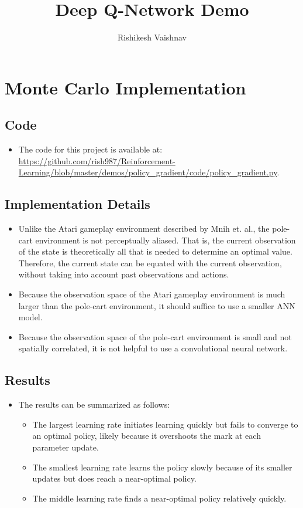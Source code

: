 \documentclass[a4paper]{article}
\title{Deep Q-Network Demo}
\author{Rishikesh Vaishnav}
\begin{document}
\maketitle
\section*{Monte Carlo Implementation}
\subsection*{Code}
\begin{itemize}
    \item The code for this project is available at: 
\url{https://github.com/rish987/Reinforcement-Learning/blob/master/demos/policy_gradient/code/policy_gradient.py}.
\end{itemize}
\subsection*{Implementation Details}
\begin{itemize}
    \item Unlike the Atari gameplay environment described by Mnih et. al., the
        pole-cart environment is not perceptually aliased. That is, the current
        observation of the state is theoretically all that is needed to
        determine an optimal value. Therefore, the current state can be equated
        with the current observation, without taking into account past
        observations and actions.
    \item Because the observation space of the Atari gameplay environment is
        much larger than the pole-cart environment, it should suffice to use a
        smaller ANN model.
    \item Because the observation space of the pole-cart environment is small
        and not spatially correlated, it is not helpful to use a convolutional
        neural network.
\end{itemize}
\subsection*{Results}
\begin{centering}
\end{centering}
\begin{itemize}
    \item The results can be summarized as follows:
    \begin{itemize}
        \item The largest learning rate initiates learning quickly
            but fails to converge to an optimal policy, likely because it
            overshoots the mark at each parameter update.
        \item The smallest learning rate learns the policy slowly because of
            its smaller updates but does reach a near-optimal policy.
        \item The middle learning rate finds a near-optimal policy relatively
            quickly.
    \end{itemize}
\end{itemize}
\end{document}
